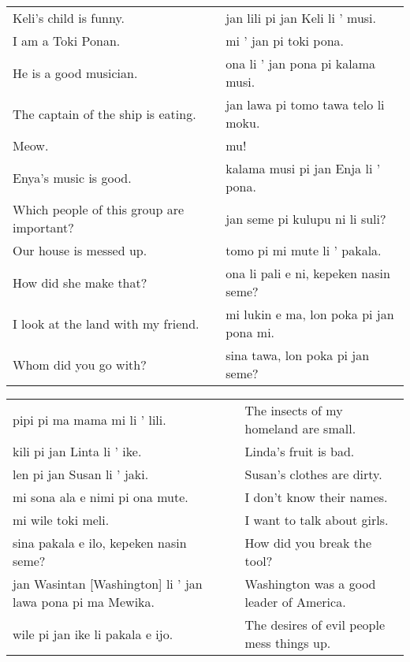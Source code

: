 \begin{supertabular}{p{5,5cm}|ll}
    Keli's child is funny.                    &  & jan lili pi jan Keli li ' musi.         \\ %
    I am a Toki Ponan.                        &  & mi ' jan pi toki pona.                  \\ %
    He is a good musician.                    &  & ona li ' jan pona pi kalama musi.       \\ %
    The captain of the ship is eating.        &  & jan lawa pi tomo tawa telo li moku.     \\ %
    Meow.                                     &  & mu!                                     \\ %
    Enya's music is good.                     &  & kalama musi pi jan Enja li ' pona.      \\ %
    Which people of this group are important? &  & jan seme pi kulupu ni li suli?          \\ %
    Our house is messed up.                   &  & tomo pi mi mute li ' pakala.            \\ %
    How did she make that?                    &  & ona li pali e ni, kepeken nasin seme?   \\ %
    I look at the land with my friend.        &  & mi lukin e ma, lon poka pi jan pona mi. \\ %
    Whom did you go with?                     &  & sina tawa, lon poka pi jan seme?        \\ %
\end{supertabular}

\begin{supertabular}{p{5,5cm}|ll}
    pipi pi ma mama mi li ' lili.                              &  & The insects of my homeland are small.      \\
    kili pi jan Linta li ' ike.                                &  & Linda's fruit is bad.                      \\
    len pi jan Susan li ' jaki.                                &  & Susan's clothes are dirty.                 \\
    mi sona ala e nimi pi ona mute.                            &  & I don't know their names.                  \\
    mi wile toki meli.                                         &  & I want to talk about girls.                \\
    sina pakala e ilo, kepeken nasin seme?                     &  & How did you break the tool?                \\
    jan Wasintan [Washington] li ' jan lawa pona pi ma Mewika. &  & Washington was a good leader of America.   \\
    wile pi jan ike li pakala e ijo.                           &  & The desires of evil people mess things up. \\
\end{supertabular}

